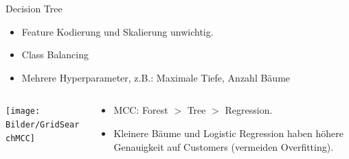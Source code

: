 \begin{frame}{Decision Tree}
{
\begin{itemize}
\item Feature Kodierung und Skalierung unwichtig.
\item Class Balancing
\item Mehrere Hyperparameter, z.B.: Maximale Tiefe, Anzahl Bäume
\end{itemize}
}
\begin{columns}
\begin{column}{0.4\textwidth}
\texttt{[image: Bilder/GridSearchMCC]} 
\end{column}
\begin{column}{0.6\textwidth}
{
\begin{itemize}
\item MCC: Forest $>$ Tree $>$ Regression.
\item Kleinere Bäume und Logistic Regression haben höhere Genauigkeit auf Customers (vermeiden Overfitting).
\end{itemize}
}
\end{column}
\end{columns}
\end{frame}

